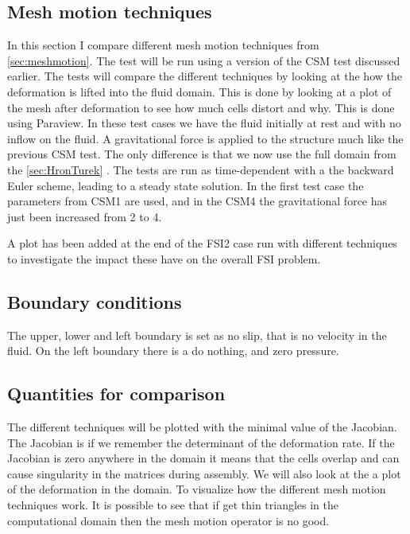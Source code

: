 \subsection{Mesh motion techniques}\label{sec:mesh_motion}
In this section I compare different mesh motion techniques from \ref{sec:meshmotion}. The test will be run using a version of the CSM test discussed earlier. The tests will compare the different techniques by looking at the how the deformation is lifted into the fluid domain. This is done by looking at a plot of the mesh after deformation to see how much cells distort and why. This is done using Paraview.\newline
In these test cases we have the fluid initially at rest and with no inflow on the fluid. A gravitational force is applied to the structure much like the previous CSM test. The only difference is that we now use the full domain from the \ref{sec:HronTurek} . The tests are run as time-dependent with a the backward Euler scheme, leading to a steady state solution. In the first test case the parameters from CSM1 are used, and in the CSM4 the gravitational force has just been increased from 2 to 4. \newline

A plot has been added at the end of the FSI2 case run with different techniques to investigate the impact these have on the overall FSI problem.

\subsection*{Boundary conditions}
The upper, lower and left boundary is set as no slip, that is no velocity in the fluid. On the left boundary there is a do nothing, and zero pressure. 
\subsection*{Quantities for comparison}
The different techniques will be plotted with the minimal value of the Jacobian. The Jacobian is if we remember the determinant of the deformation rate. If the Jacobian is zero anywhere in the domain it means that the cells overlap and can cause singularity in the matrices during assembly. \newline
We will also look at the a plot of the deformation in the domain. To visualize how the different mesh motion techniques work. It is possible to see that if get thin triangles in the computational domain then the mesh motion operator is no good. 
